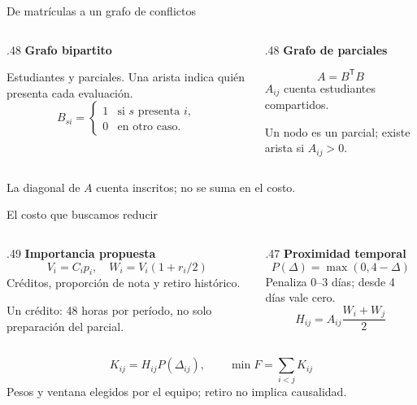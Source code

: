 \documentclass[aspectratio=169,11pt]{beamer}
\begin{document}
\begin{frame}{De matrículas a un grafo de conflictos}
  \begin{columns}[T,onlytextwidth]
    \begin{column}{.48\textwidth}
      \textbf{Grafo bipartito}\par\medskip
      Estudiantes y parciales. Una arista indica quién presenta cada evaluación.
      \[B_{si}=\begin{cases}1&\text{si $s$ presenta $i$},\\0&\text{en otro caso.}\end{cases}\]
    \end{column}
    \begin{column}{.48\textwidth}
      \textbf{Grafo de parciales}\par\medskip
      \[A=B^{\mathsf T}B\]
      $A_{ij}$ cuenta estudiantes compartidos.\par\medskip
      Un nodo es un parcial; existe arista si $A_{ij}>0$.
    \end{column}
  \end{columns}
  \vfill\small La diagonal de $A$ cuenta inscritos; no se suma en el costo.
\end{frame}

\begin{frame}{El costo que buscamos reducir}
  \begin{columns}[T,onlytextwidth]
    \begin{column}{.49\textwidth}
      \textbf{Importancia propuesta}
      \[V_i=C_i p_i,\quad W_i=V_i(1+r_i/2)\]
      \small Créditos, proporción de nota y retiro histórico.\par\medskip
      Un crédito: 48 horas por período, no solo preparación del parcial.
    \end{column}
    \begin{column}{.47\textwidth}
      \textbf{Proximidad temporal}
      \[P(\Delta)=\max(0,4-\Delta)\]
      \small Penaliza 0--3 días; desde 4 días vale cero.
      \[H_{ij}=A_{ij}\frac{W_i+W_j}{2}\]
    \end{column}
  \end{columns}
  \[K_{ij}=H_{ij}P(\Delta_{ij}),\qquad \min F=\sum_{i<j}K_{ij}\]
  \small Pesos y ventana elegidos por el equipo; retiro no implica causalidad.
\end{frame}
\end{document}
